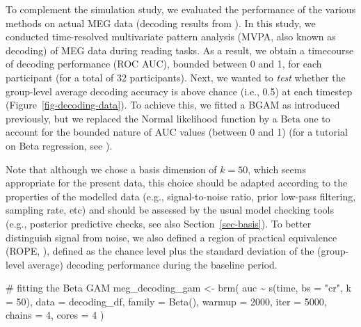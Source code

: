 \documentclass[
  man,
  floatsintext,
  longtable,
  a4paper,
  nolmodern,
  notxfonts,
  notimes,
  colorlinks=true,linkcolor=blue,citecolor=blue,urlcolor=blue]{apa7}
\newenvironment{Shaded}{\begin{snugshade}}{\end{snugshade}}
\newcommand{\AttributeTok}[1]{\textcolor[rgb]{0.40,0.45,0.13}{#1}}
\newcommand{\CommentTok}[1]{\textcolor[rgb]{0.37,0.37,0.37}{#1}}
\newcommand{\DecValTok}[1]{\textcolor[rgb]{0.68,0.00,0.00}{#1}}
\newcommand{\FunctionTok}[1]{\textcolor[rgb]{0.28,0.35,0.67}{#1}}
\newcommand{\NormalTok}[1]{\textcolor[rgb]{0.00,0.23,0.31}{#1}}
\newcommand{\OtherTok}[1]{\textcolor[rgb]{0.00,0.23,0.31}{#1}}
\newcommand{\SpecialCharTok}[1]{\textcolor[rgb]{0.37,0.37,0.37}{#1}}
\newcommand{\StringTok}[1]{\textcolor[rgb]{0.13,0.47,0.30}{#1}}
\begin{document}
To complement the simulation study, we evaluated the performance of the
various methods on actual MEG data (decoding results from
). In
this study, we conducted time-resolved multivariate pattern analysis
(MVPA, also known as decoding) of MEG data during reading tasks. As a
result, we obtain a timecourse of decoding performance (ROC AUC),
bounded between 0 and 1, for each participant (for a total of 32
participants). Next, we wanted to \emph{test} whether the group-level
average decoding accuracy is above chance (i.e., 0.5) at each timestep
(Figure~\ref{fig-decoding-data}). To achieve this, we fitted a BGAM as
introduced previously, but we replaced the \(\mathrm{Normal}\)
likelihood function by a \(\mathrm{Beta}\) one to account for the
bounded nature of AUC values (between 0 and 1) (for a tutorial on Beta
regression, see ).

Note that although we chose a basis dimension of \(k=50\), which seems
appropriate for the present data, this choice should be adapted
according to the properties of the modelled data (e.g., signal-to-noise
ratio, prior low-pass filtering, sampling rate, etc) and should be
assessed by the usual model checking tools (e.g., posterior predictive
checks, see also Section~\ref{sec-basis}). To better distinguish signal
from noise, we also defined a region of practical equivalence (ROPE,
), defined as the
chance level plus the standard deviation of the (group-level average)
decoding performance during the baseline period.

\begin{Shaded}
\begin{Highlighting}[]
\CommentTok{\# fitting the Beta GAM}
\NormalTok{meg\_decoding\_gam }\OtherTok{\textless{}{-}} \FunctionTok{brm}\NormalTok{(}
\NormalTok{    auc }\SpecialCharTok{\textasciitilde{}} \FunctionTok{s}\NormalTok{(time, }\AttributeTok{bs =} \StringTok{"cr"}\NormalTok{, }\AttributeTok{k =} \DecValTok{50}\NormalTok{),}
    \AttributeTok{data =}\NormalTok{ decoding\_df,}
    \AttributeTok{family =} \FunctionTok{Beta}\NormalTok{(),}
    \AttributeTok{warmup =} \DecValTok{2000}\NormalTok{,}
    \AttributeTok{iter =} \DecValTok{5000}\NormalTok{,}
    \AttributeTok{chains =} \DecValTok{4}\NormalTok{,}
    \AttributeTok{cores =} \DecValTok{4}
\NormalTok{    )}
\end{Highlighting}
\end{Shaded}
\end{document}
